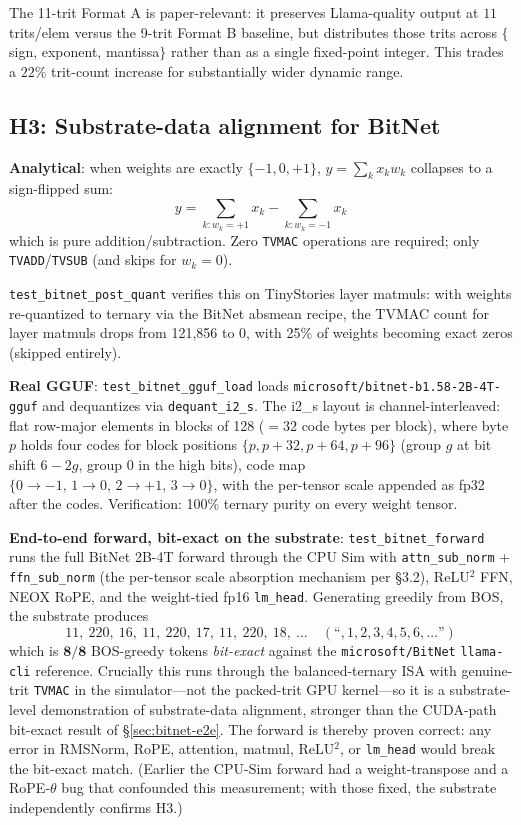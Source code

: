 \documentclass{article}
\begin{document}
The 11-trit Format A is paper-relevant: it preserves Llama-quality
output at $11$ trits/elem versus the 9-trit Format B baseline, but
distributes those trits across $\{$sign, exponent, mantissa$\}$ rather
than as a single fixed-point integer. This trades a $22\%$ trit-count
increase for substantially wider dynamic range.

\subsection{H3: Substrate-data alignment for BitNet} \label{sec:h3}

\textbf{Analytical}: when weights are exactly $\{-1, 0, +1\}$,
$y = \sum_k x_k w_k$ collapses to a sign-flipped sum:
\begin{equation}
  y = \sum_{k : w_k = +1} x_k - \sum_{k : w_k = -1} x_k
\end{equation}
which is pure addition/subtraction. Zero \texttt{TVMAC} operations are
required; only \texttt{TVADD}/\texttt{TVSUB} (and skips for $w_k = 0$).

\texttt{test\_bitnet\_post\_quant} verifies this on TinyStories layer
matmuls: with weights re-quantized to ternary via the BitNet
absmean recipe, the {TVMAC} count for layer matmuls drops from
121{,}856 to 0, with 25\% of weights becoming exact zeros (skipped
entirely).

\textbf{Real GGUF}: \texttt{test\_bitnet\_gguf\_load} loads
\texttt{microsoft/bitnet-b1.58-2B-4T-gguf} and dequantizes via
\texttt{dequant\_i2\_s}. The i2\_s layout is channel-interleaved: flat
row-major elements in blocks of 128 ($= 32$ code bytes per block), where
byte $p$ holds four codes for block positions $\{p, p{+}32, p{+}64,
p{+}96\}$ (group $g$ at bit shift $6 - 2g$, group 0 in the high bits),
code map $\{0 \to {-}1,\, 1 \to 0,\, 2 \to {+}1,\, 3 \to 0\}$, with the
per-tensor scale appended as fp32 after the codes. Verification: 100\%
ternary purity on every weight tensor.

\textbf{End-to-end forward, bit-exact on the substrate}:
\texttt{test\_bitnet\_forward} runs the full BitNet 2B-4T forward
through the {CPU} {Sim} with \texttt{attn\_sub\_norm} +
\texttt{ffn\_sub\_norm} (the per-tensor scale absorption mechanism per
\citep{bitnet158-2024} \S 3.2), {ReLU}$^2$ {FFN}, {NEOX} {RoPE}, and the
weight-tied fp16 \texttt{lm\_head}. Generating greedily from {BOS},
the substrate produces
\[
  11,\ 220,\ 16,\ 11,\ 220,\ 17,\ 11,\ 220,\ 18,\ \ldots
  \quad (\text{``}, 1, 2, 3, 4, 5, 6, \ldots\text{''})
\]
which is $\mathbf{8/8}$ {BOS}-greedy tokens \emph{bit-exact} against the
\texttt{microsoft/BitNet} \texttt{llama-cli} reference. Crucially this
runs through the balanced-ternary {ISA} with genuine-trit \texttt{TVMAC}
in the simulator---not the packed-trit {GPU} kernel---so it is a
substrate-level demonstration of substrate-data alignment, stronger than
the {CUDA}-path bit-exact result of \S\ref{sec:bitnet-e2e}. The forward
is thereby proven correct: any error in RMSNorm, RoPE, attention,
matmul, {ReLU}$^2$, or \texttt{lm\_head} would break the bit-exact
match. (Earlier the {CPU}-{Sim} forward had a weight-transpose and a
{RoPE}-$\theta$ bug that confounded this measurement; with those fixed,
the substrate independently confirms H3.)
\end{document}
